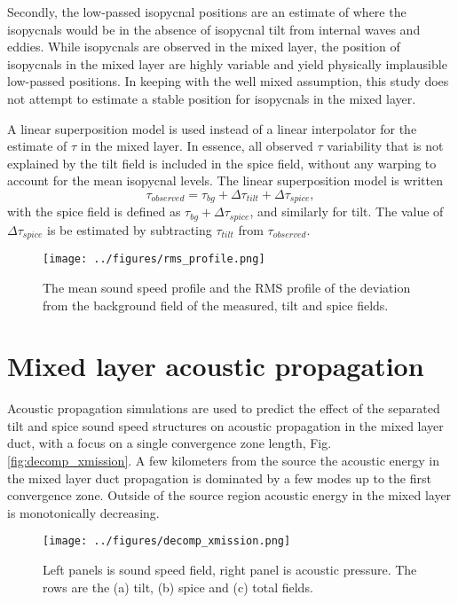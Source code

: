 \documentclass[preprint,NumberedRefs]{JASA}
\begin{document}
Secondly, the low-passed isopycnal positions are an estimate of where the isopycnals would be in the absence of isopycnal tilt from internal waves and eddies. While isopycnals are observed in the mixed layer, the position of isopycnals in the mixed layer are highly variable and yield physically implausible low-passed positions. In keeping with the well mixed assumption, this study does not attempt to estimate a stable position for isopycnals in the mixed layer.

A linear superposition model is used instead of a linear interpolator for the estimate of $\tau$ in the mixed layer. In essence, all observed $\tau$ variability that is not explained by the tilt field is included in the spice field, without any warping to account for the mean isopycnal levels. The linear superposition model is written
\begin{equation}
    \tau_{observed} = \tau_{bg} + \Delta \tau_{tilt} + \Delta \tau_{spice},
\end{equation}
with the spice field is defined as $\tau_{bg} + \Delta \tau_{spice}$, and similarly for tilt. The value of $\Delta \tau_{spice}$ is be estimated by subtracting $\tau_{tilt}$ from $\tau_{observed}$.

\begin{figure}
\texttt{[image: ../figures/rms\_profile.png]}
    \caption{\label{fig:c_rms}{The mean sound speed profile and the RMS profile of the deviation from the background field of the measured, tilt and spice fields. }}
\end{figure}

\section{\label{sec:propagation}Mixed layer acoustic propagation}
Acoustic propagation simulations are used to predict the effect of the separated tilt and spice sound speed structures on acoustic propagation in the mixed layer duct, with a focus on a single convergence zone length, Fig. \ref{fig:decomp_xmission}. A few kilometers from the source the acoustic energy in the mixed layer duct propagation is dominated by a few modes up to the first convergence zone. Outside of the source region acoustic energy in the mixed layer is monotonically decreasing.

\begin{figure}
\texttt{[image: ../figures/decomp\_xmission.png]}
    \caption{\label{fig:decomp_x}{Left panels is sound speed field, right panel is acoustic pressure. The rows are the (a) tilt, (b) spice and (c) total fields.}}
\end{figure}
\end{document}

